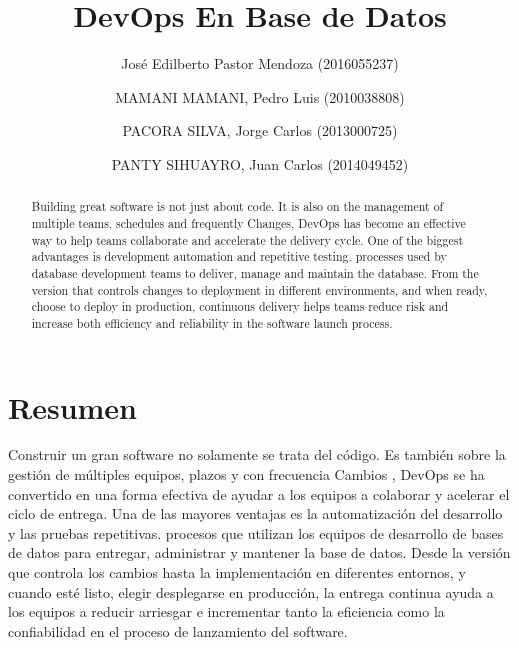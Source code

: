 \documentclass[preprint,12pt]{elsarticle}
\begin{document}
	


	\begin{frontmatter}

		\title{\huge  DevOps En Base de Datos}
		
		\author{José Edilberto Pastor Mendoza              (2016055237)}
		\author{MAMANI MAMANI, Pedro Luis              (2010038808)}
		\author{PACORA SILVA, Jorge Carlos                   (2013000725)}
		\author{PANTY SIHUAYRO, Juan Carlos               (2014049452)}
		
		\address{Tacna, Perú}
		
		\begin{abstract}
			
Building great software is not just about code. It is also on the management of multiple teams, schedules and frequently Changes, DevOps has become an effective way to help teams collaborate and accelerate the delivery cycle. One of the biggest advantages is development automation and repetitive testing. processes used by database development teams to deliver, manage and maintain the database. From the version that controls changes to deployment in different environments, and when ready, choose to deploy in production, continuous delivery helps teams reduce risk and increase both efficiency and reliability in the software launch process.


		\end{abstract}
\end{frontmatter}

	\section{Resumen}

Construir un gran software no solamente se trata del código. Es también
sobre la gestión de múltiples equipos, plazos y con frecuencia
Cambios , DevOps se ha convertido en una forma efectiva de ayudar a los equipos a colaborar y acelerar el ciclo de entrega.
Una de las mayores ventajas es la automatización del desarrollo y las pruebas repetitivas.
procesos que utilizan los equipos de desarrollo de bases de datos para entregar, administrar y mantener la base de datos. Desde la versión que controla los cambios hasta la implementación en diferentes entornos, y cuando esté listo, elegir desplegarse en producción, la entrega continua ayuda a los equipos a reducir
arriesgar e incrementar tanto la eficiencia como la confiabilidad en el proceso de lanzamiento del software.
\end{document}
